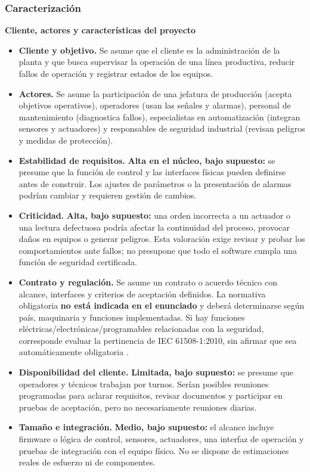 \subsubsection{Caracterización}
\textbf{Cliente, actores y características del proyecto}
\begin{itemize}
  \item \textbf{Cliente y objetivo.} Se asume que el cliente es la administración
  de la planta y que busca supervisar la operación de una línea productiva,
  reducir fallos de operación y registrar estados de los equipos.

  \item \textbf{Actores.} Se asume la participación de una jefatura de producción
  (acepta objetivos operativos), operadores (usan las señales y alarmas),
  personal de mantenimiento (diagnostica fallos), especialistas en
  automatización (integran sensores y actuadores) y responsables de
  seguridad industrial (revisan peligros y medidas de protección).

  \item \textbf{Estabilidad de requisitos.} \textbf{Alta en el núcleo, bajo
  supuesto:} se presume que la función de control y las interfaces físicas
  pueden definirse antes de construir. Los ajustes de parámetros o la
  presentación de alarmas podrían cambiar y requieren gestión de cambios.

  \item \textbf{Criticidad.} \textbf{Alta, bajo supuesto:} una orden incorrecta a
  un actuador o una lectura defectuosa podría afectar la continuidad del
  proceso, provocar daños en equipos o generar peligros. Esta valoración
  exige revisar y probar los comportamientos ante fallos; no presupone
  que todo el software cumpla una función de seguridad certificada.

  \item \textbf{Contrato y regulación.} Se asume un contrato o acuerdo técnico con
  alcance, interfaces y criterios de aceptación definidos. La normativa
  obligatoria \textbf{no está indicada en el enunciado} y deberá
  determinarse según país, maquinaria y funciones implementadas. Si hay
  funciones eléctricas/electrónicas/programables relacionadas con la
  seguridad, corresponde evaluar la pertinencia de IEC 61508-1:2010,
  sin afirmar que sea automáticamente obligatoria
  \cite{iec61508_2010}.

  \item \textbf{Disponibilidad del cliente.} \textbf{Limitada, bajo supuesto:}
  se presume que operadores y técnicos trabajan por turnos. Serían
  posibles reuniones programadas para aclarar requisitos, revisar
  documentos y participar en pruebas de aceptación, pero no necesariamente
  reuniones diarias.

  \item \textbf{Tamaño e integración.} \textbf{Medio, bajo supuesto:} el alcance
  incluye firmware o lógica de control, sensores, actuadores, una interfaz
  de operación y pruebas de integración con el equipo físico. No se
  dispone de estimaciones reales de esfuerzo ni de componentes.
\end{itemize}

